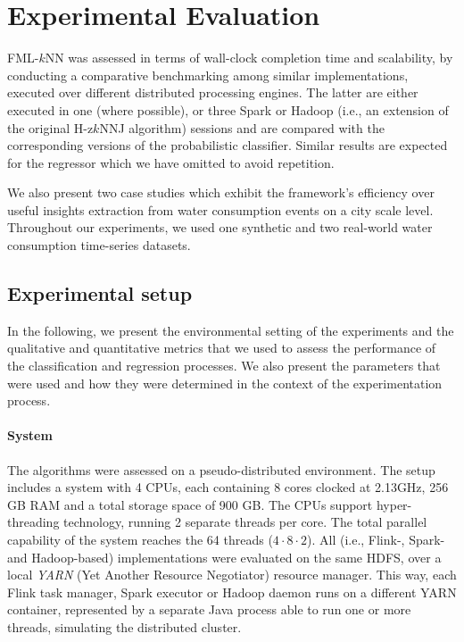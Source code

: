 
\section{Experimental Evaluation}
\label{sec:knn_experiment}

\graphicspath{{Papers/SpringerJournalOfBigData/}}

FML-$k$NN was assessed in terms of wall-clock completion time and scalability, by conducting a comparative benchmarking among similar implementations, executed over different distributed processing engines. The latter are either executed in one (where possible), or three Spark or Hadoop (i.e., an extension of the original H-z$k$NNJ algorithm) sessions and are compared with the corresponding versions of the probabilistic classifier. Similar results are expected for the regressor which we have omitted to avoid repetition.

We also present two case studies which exhibit the framework's efficiency over useful insights extraction from water consumption events on a city scale level. Throughout our experiments, we used one synthetic and two real-world water consumption time-series datasets.

\subsection{Experimental setup}
\label{subsec:expsetup}
In the following, we present the environmental setting of the experiments and the qualitative and quantitative metrics that we used to assess the performance of the classification and regression processes. We also present the parameters that were used and how they were determined in the context of the experimentation process.

\paragraph{System}
\label{par:system}
The algorithms were assessed on a pseudo-distributed environment. The setup includes a system with 4 CPUs, each containing 8 cores clocked at 2.13GHz, 256 GB RAM and a total storage space of 900 GB. The CPUs support hyper-threading technology, running 2 separate threads per core. The total parallel capability of the system reaches the 64 threads ($4 \cdot 8 \cdot 2$). All (i.e., Flink-, Spark- and Hadoop-based) implementations were evaluated on the same HDFS, over a local \textit{YARN} (Yet Another Resource Negotiator) resource manager. This way, each Flink task manager, Spark executor or Hadoop daemon runs on a different YARN container, represented by a separate Java process able to run one or more threads, simulating the distributed cluster.

